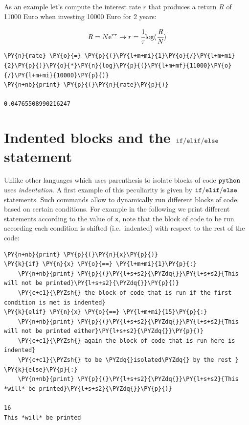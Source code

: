 As an example let's compute the interest rate \(r\) that produces a return \(R\) of 11000 Euro when investing 10000 Euro for 2 years:

\[R = N\mathrm{e}^{r\tau} \rightarrow r = \cfrac{1}{\tau} \mathrm{log}(\cfrac{R}{N})\]

\begin{tcolorbox}[breakable, size=fbox, boxrule=1pt, pad at break*=1mm, colback=cellbackground, colframe=cellborder]            
\begin{Verbatim}[commandchars=\\\{\}]
\PY{n}{rate} \PY{o}{=} \PY{p}{(}\PY{l+m+mi}{1}\PY{o}{/}\PY{l+m+mi}{2}\PY{p}{)}\PY{o}{*}\PY{n}{log}\PY{p}{(}\PY{l+m+mf}{11000}\PY{o}{/}\PY{l+m+mi}{10000}\PY{p}{)}
\PY{n+nb}{print} \PY{p}{(}\PY{n}{rate}\PY{p}{)}

0.04765508990216247
\end{Verbatim}
\end{tcolorbox}

\section{Indented blocks and the $\tt{if/elif/else}$ statement}\label{indented-blocks-and-the-ttifelse-statement}

Unlike other languages which uses parenthesis to isolate blocks of code $\tt{python}$ uses \emph{indentation}. A first example of this peculiarity is given by $\tt{if/elif/else}$ statements. Such commands allow to dynamically run different blocks of code based on certain conditions. For example in the following we print different statements according to the value of \texttt{x}, note that the block of code to be run according each condition is shifted (i.e.~indented) with respect to the rest of the code:

\begin{tcolorbox}[breakable, size=fbox, boxrule=1pt, pad at break*=1mm, colback=cellbackground, colframe=cellborder]            
\begin{Verbatim}[commandchars=\\\{\}]
\PY{n+nb}{print} \PY{p}{(}\PY{n}{x}\PY{p}{)}
\PY{k}{if} \PY{n}{x} \PY{o}{==} \PY{l+m+mi}{1}\PY{p}{:} 
    \PY{n+nb}{print} \PY{p}{(}\PY{l+s+s2}{\PYZdq{}}\PY{l+s+s2}{This will not be printed}\PY{l+s+s2}{\PYZdq{}}\PY{p}{)} 
    \PY{c+c1}{\PYZsh{} the block of code that is run if the first condition is met is indented}
\PY{k}{elif} \PY{n}{x} \PY{o}{==} \PY{l+m+mi}{15}\PY{p}{:}
    \PY{n+nb}{print} \PY{p}{(}\PY{l+s+s2}{\PYZdq{}}\PY{l+s+s2}{This will not be printed either}\PY{l+s+s2}{\PYZdq{}}\PY{p}{)}
    \PY{c+c1}{\PYZsh{} again the block of code that is run here is indented}
    \PY{c+c1}{\PYZsh{} to be \PYZdq{}isolated\PYZdq{} by the rest }
\PY{k}{else}\PY{p}{:}
    \PY{n+nb}{print} \PY{p}{(}\PY{l+s+s2}{\PYZdq{}}\PY{l+s+s2}{This *will* be printed}\PY{l+s+s2}{\PYZdq{}}\PY{p}{)}

16
This *will* be printed
\end{Verbatim}
\end{tcolorbox}

